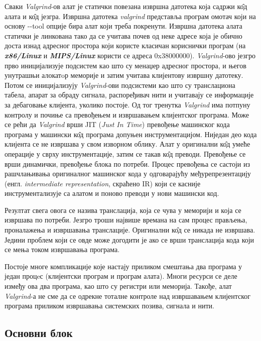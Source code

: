 \documentclass[12pt,oneside]{memoir}
\begin{document}
\indent Сваки \textit{Valgrind}-ов алат је статички повезана извршна датотека која садржи к\^{о}д алата и к\^{о}д језгра. Извршна датотека \textit{valgrind} представља програм омотач који на основу -\--tool опције бира алат који треба покренути. Извршна датотека алата статички је линкована тако да се учитава почев од неке адресе која је обично доста изнад адресног простора који користе класичан кориснички програм (на \textbf{\textit{x86/Linux}} и \textbf{\textit{MIPS/Linux}} користи се адреса 0x38000000). \textit{Valgrind}-ово језгро прво иницијализује подсистем као што су менаџер адресног простора, и његов унутрашњи алокатoр меморије и затим учитава клијентову извршну датотеку. Потом се иницијализују \textit{Valgrind}-ови подсистеми као што су транслациона табела, апарат за обраду сигнала, распоређивач нити и учитавају се информације за дебаговање клијента, уколико постоје. Од тог тренутка \textit{Valgrind} има потпуну контролу и почиње са превођењем и извршавањем клијентског програма. Може се рећи да \textit{Valgrind} врши JIT (\textit{Just In Time}) превођење машинског кода програма у машински к\^{о}д програма допуњен инструментацијом. Ниједан део кода клијента се не извршава у свом изворном облику. Алат у оригинални к\^{о}д умеће операције у сврху инструментације, затим се такав к\^{о}д преводи. Превођење се врши динамички, превођење блока по потреби. Процес превођења се састоји из рашчлањивања оригиналног машинског кода у одговарајућу међурепрезентацију (енгл. \textit{intermediate representation}, скраћено IR) који се касније инструментализује са алатом и поново преводи у нови машински код. 

\indent Резултат свега овога се назива транслација, која се чува у меморији и која се извршава по потреби. Језгро троши највише времана на сам процес прављења, проналажења и извршавања транслације. Оригинални к\^{о}д се никада не извршава. Једини проблем који се овде може догодити је ако се врши транслација кода који се мења током извршавања програма.

\indent Постоје многе компликације које настају приликом смештања два програма у један процeс (клијентски програм и програм алата). Многи ресурси се деле између ова два програма, као што су регистри или меморија. Такође, алат \textit{Valgrind}-а не сме да се одрекне тоталне контроле над извршавањем клијентског програма приликом извршавања системских позива, сигнала и нити.

\subsection{Основни блок}
\end{document}

